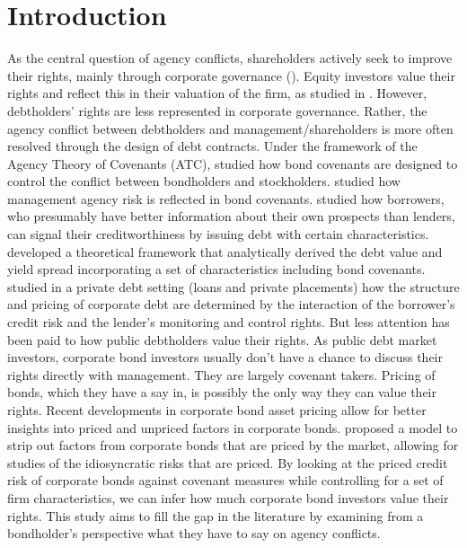 \documentclass[a4paper, 10pt, authoryear]{elsarticle}
\begin{document}
\section{Introduction}
As the central question of agency conflicts, shareholders actively seek to improve their rights, mainly through corporate governance (\cite{gillanCorporateGovernanceProposals2000}). Equity investors value their rights and reflect this in their valuation of the firm, as studied in \cite{gompersCorporateGovernanceEquity2003}. However, debtholders' rights are less represented in corporate governance. Rather, the agency conflict between debtholders and management/shareholders is more often resolved through the design of debt contracts. Under the framework of the Agency Theory of Covenants (ATC), \cite{smithFinancialContracting1979} studied how bond covenants are designed to control the conflict between bondholders and stockholders. \cite{chavaManagerialAgencyBond2010} studied how management agency risk is reflected in bond covenants. \cite{diamondSeniorityMaturityDebt1993} studied how borrowers, who presumably have better information about their own prospects than lenders, can signal their creditworthiness by issuing debt with certain characteristics. \cite{lelandCorporateDebtValue1994a} developed a theoretical framework that analytically derived the debt value and yield spread incorporating a set of characteristics including bond covenants. \cite{bradleyStructurePricingCorporate2015} studied in a private debt setting (loans and private placements) how the structure and pricing of corporate debt are determined by the interaction of the borrower's credit risk and the lender's monitoring and control rights. But less attention has been paid to how public debtholders value their rights. As public debt market investors, corporate bond investors usually don't have a chance to discuss their rights directly with management. They are largely covenant takers. Pricing of bonds, which they have a say in, is possibly the only way they can value their rights. Recent developments in corporate bond asset pricing allow for better insights into priced and unpriced factors in corporate bonds. \cite{vanbinsbergenDurationBasedValuationCorporate2025} proposed a model to strip out factors from corporate bonds that are priced by the market, allowing for studies of the idiosyncratic risks that are priced. By looking at the priced credit risk of corporate bonds against covenant measures while controlling for a set of firm characteristics, we can infer how much corporate bond investors value their rights. This study aims to fill the gap in the literature by examining from a bondholder's perspective what they have to say on agency conflicts.
\end{document}
